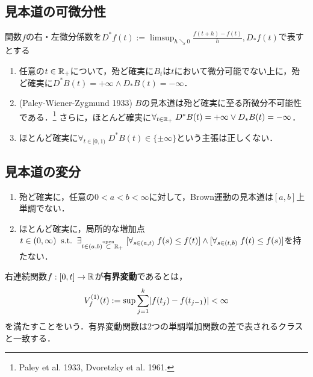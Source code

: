 \documentclass[uplatex,dvipdfmx]{jsreport}
\begin{document}
\subsection{見本道の可微分性}


\begin{proposition}
    関数$f$の右・左微分係数を$D^*f(t):=\limsup_{h\searrow0}\frac{f(t+h)-f(t)}{h},D_*f(t)$で表すとする
    \begin{enumerate}
        \item 任意の$t\in\mathbb{R}_+$について，殆ど確実に$B_t$は$t$において微分可能でない上に，殆ど確実に$D^*B(t)=+\infty\land D_*B(t)=-\infty$．
        \item (Paley-Wiener-Zygmund 1933) $B$の見本道は殆ど確実に至る所微分不可能性である．\footnote{Paley et al. 1933, Dvoretzky et al. 1961.}
        さらに，ほとんど確実に$\forall_{t\in\mathbb{R}_+}\;D^*B(t)=+\infty\lor D_*B(t)=-\infty$．
        \item ほとんど確実に$\forall_{t\in[0,1)}\;D^*B(t)\in\{\pm\infty\}$という主張は正しくない．
    \end{enumerate}
\end{proposition}

\subsection{見本道の変分}

\begin{proposition}[erratic]\mbox{}
    \begin{enumerate}
        \item 殆ど確実に，任意の$0<a<b<\infty$に対して，Brown運動の見本道は$[a,b]$上単調でない．
        \item ほとんど確実に，局所的な増加点$t\in(0,\infty)\;\;\mathrm{s.t.}\;\;\exists_{t\in(a,b)\overset{\mathrm{open}}{\subset}\mathbb{R}_+}\;[\forall_{s\in(a,t)}\;f(s)\le f(t)]\land[\forall_{s\in(t,b)}\;f(t)\le f(s)]$を持たない．
    \end{enumerate}
\end{proposition}

\begin{definition}
    右連続関数$f:[0,t]\to\mathbb{R}$が\textbf{有界変動}であるとは，
    \[V_f^{(1)}(t):=\sup\sum^k_{j=1}\lvert f(t_j)-f(t_{j-1})\rvert<\infty\]
    を満たすことをいう．有界変動関数は2つの単調増加関数の差で表されるクラスと一致する．
\end{definition}
\end{document}

